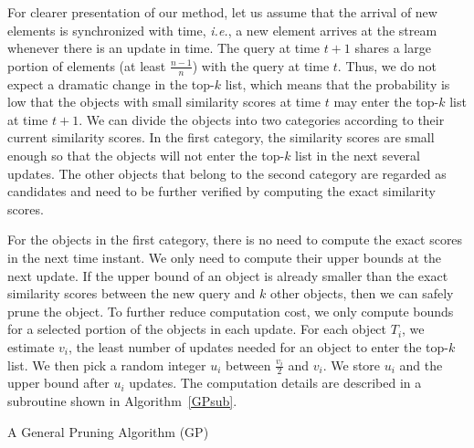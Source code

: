 For clearer presentation of our method, let us assume that the arrival of new elements is synchronized with time, \emph{i.e.}, a new element arrives at the stream whenever there is an update in time. The query at time $t+1$ shares a large portion of elements (at least $\frac{n-1}{n}$) with the query at time $t$. Thus, we do not expect a dramatic change in the top-$k$ list, which means that the probability is low that the objects with small similarity scores at time $t$ may enter the top-$k$ list at time $t+1$. We can divide the objects into two categories according to their current similarity scores. In the first category, the similarity scores are small enough so that the objects will not enter the top-$k$ list in the next several updates. The other objects that belong to the second category are regarded as candidates and need to be further verified by computing the exact similarity scores.

For the objects in the first category, there is no need to compute the exact scores in the next time instant. We only need to compute their upper bounds at the next update. If the upper bound of an object is already smaller than the exact similarity scores between the new query and $k$ other objects, then we can safely prune the object. To further reduce computation cost, we only compute bounds for a selected portion of the objects in each update. For each object $T_i$, we estimate $v_i$, the least number of updates needed for an object to enter the top-$k$ list.  We then pick a random integer $u_i$ between $\frac{v_i}{2}$ and $v_i$. We store $u_i$ and the upper bound after $u_i$ updates.  The computation details are described in a subroutine shown in Algorithm~\ref{GPsub}.

 \begin{algorithm2e}[t]
\SetAlgoLined%
 \caption{A General Pruning Algorithm (GP)}
 \label{GPmain}
\end{algorithm2e} 

